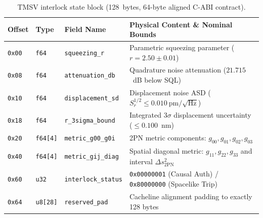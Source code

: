 \documentclass[11pt,onecolumn]{article}
\begin{document}
\begin{table}[!htbp]
\centering\small
\caption{TMSV interlock state block (128~bytes, 64-byte aligned C-ABI contract).}
\label{tab:tmsv_state}
\begin{tabularx}{\textwidth}{@{}l l l X@{}}
\toprule
Offset & Type & Field Name & Physical Content \& Nominal Bounds \\
\midrule
\texttt{0x00} & \texttt{f64} & \texttt{squeezing\_r} & Parametric squeezing parameter ($r = 2.50\pm 0.01$) \\
\texttt{0x08} & \texttt{f64} & \texttt{attenuation\_db} & Quadrature noise attenuation ($21.715$~dB below SQL) \\
\texttt{0x10} & \texttt{f64} & \texttt{displacement\_sd} & Displacement noise ASD ($S_r^{1/2} \le 0.010~\text{pm}/\sqrt{\text{Hz}}$) \\
\texttt{0x18} & \texttt{f64} & \texttt{r\_3sigma\_bound} & Integrated $3\sigma$ displacement uncertainty ($\le 0.100$~nm) \\
\texttt{0x20} & \texttt{f64[4]} & \texttt{metric\_g00\_g0i} & 2PN metric components: $g_{00}, g_{01}, g_{02}, g_{03}$ \\
\texttt{0x40} & \texttt{f64[4]} & \texttt{metric\_gij\_diag} & Spatial diagonal metric: $g_{11}, g_{22}, g_{33}$ and interval $\Delta s^2_{\text{2PN}}$ \\
\texttt{0x60} & \texttt{u32} & \texttt{interlock\_status} & \texttt{0x00000001} (Causal Auth) / \texttt{0x80000000} (Spacelike Trip) \\
\texttt{0x64} & \texttt{u8[28]} & \texttt{reserved\_pad} & Cacheline alignment padding to exactly 128 bytes \\
\bottomrule
\end{tabularx}
\end{table}
\end{document}
